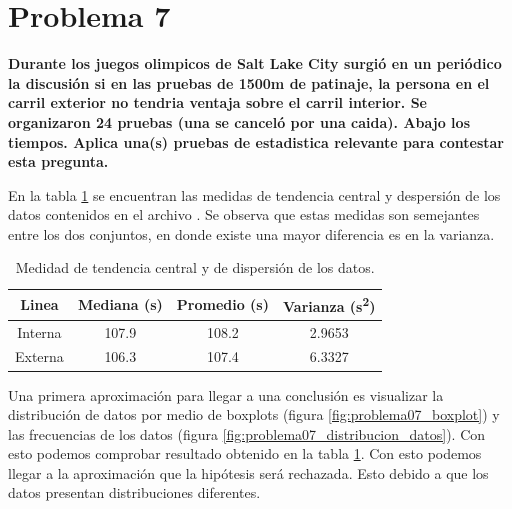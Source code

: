 \section*{Problema 7}

\textbf{Durante los juegos olimpicos de Salt Lake City surgió en un periódico la discusión si en las pruebas de 1500m de patinaje, la persona en el carril exterior no tendria ventaja sobre el carril interior. Se organizaron 24 pruebas (una se canceló por una caida). Abajo los tiempos. Aplica una(s) pruebas de estadistica relevante para contestar esta pregunta.}

En la tabla \ref{table:problema07} se encuentran las medidas de tendencia central y despersión de los datos contenidos en el archivo . Se observa que estas medidas son semejantes entre los dos conjuntos, en donde existe una mayor diferencia es en la varianza.

\begin{table}[H]
	\centering
	\begin{tabular}{cccc} \hline
		\textbf{Linea} & \textbf{Mediana (s)} & \textbf{Promedio (s)} & \textbf{Varianza (s\textsuperscript{2})} \\ \hline
		Interna        & 107.9                & 108.2                 & 2.9653                                   \\
		Externa        & 106.3                & 107.4                 & 6.3327                                   \\ \hline
	\end{tabular}
	\caption{Medidad de tendencia central y de dispersión de los datos.}
	\label{table:problema07}
\end{table}

Una primera aproximación para llegar a una conclusión es visualizar la distribución de datos por medio de boxplots (figura \ref{fig:problema07_boxplot}) y las frecuencias de los datos (figura \ref{fig:problema07_distribucion_datos}). Con esto podemos comprobar resultado obtenido en la tabla \ref{table:problema07}. Con esto podemos llegar a la aproximación que la hipótesis será rechazada. Esto debido a que los datos presentan distribuciones diferentes.


